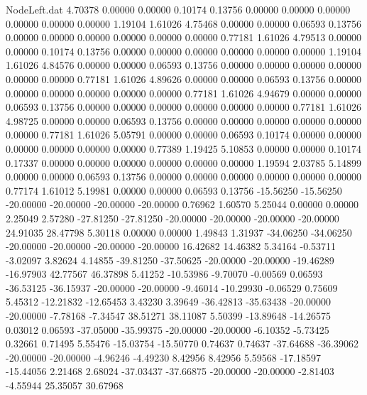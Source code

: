 \begin{filecontents}{NodeLeft.dat}
   4.70378    0.00000    0.00000     0.10174    0.13756    0.00000    0.00000    0.00000    0.00000    0.00000    0.00000    1.19104    1.61026
   4.75468    0.00000    0.00000     0.06593    0.13756    0.00000    0.00000    0.00000    0.00000    0.00000    0.00000    0.77181    1.61026
   4.79513    0.00000    0.00000     0.10174    0.13756    0.00000    0.00000    0.00000    0.00000    0.00000    0.00000    1.19104    1.61026
   4.84576    0.00000    0.00000     0.06593    0.13756    0.00000    0.00000    0.00000    0.00000    0.00000    0.00000    0.77181    1.61026
   4.89626    0.00000    0.00000     0.06593    0.13756    0.00000    0.00000    0.00000    0.00000    0.00000    0.00000    0.77181    1.61026
   4.94679    0.00000    0.00000     0.06593    0.13756    0.00000    0.00000    0.00000    0.00000    0.00000    0.00000    0.77181    1.61026
   4.98725    0.00000    0.00000     0.06593    0.13756    0.00000    0.00000    0.00000    0.00000    0.00000    0.00000    0.77181    1.61026
   5.05791    0.00000    0.00000     0.06593    0.10174    0.00000    0.00000    0.00000    0.00000    0.00000    0.00000    0.77389    1.19425
   5.10853    0.00000    0.00000     0.10174    0.17337    0.00000    0.00000    0.00000    0.00000    0.00000    0.00000    1.19594    2.03785
   5.14899    0.00000    0.00000     0.06593    0.13756    0.00000    0.00000    0.00000    0.00000    0.00000    0.00000    0.77174    1.61012
   5.19981    0.00000    0.00000     0.06593    0.13756  -15.56250  -15.56250  -20.00000  -20.00000  -20.00000  -20.00000    0.76962    1.60570
   5.25044    0.00000    0.00000     2.25049    2.57280  -27.81250  -27.81250  -20.00000  -20.00000  -20.00000  -20.00000   24.91035   28.47798
   5.30118    0.00000    0.00000     1.49843    1.31937  -34.06250  -34.06250  -20.00000  -20.00000  -20.00000  -20.00000   16.42682   14.46382
   5.34164   -0.53711   -3.02097     3.82624    4.14855  -39.81250  -37.50625  -20.00000  -20.00000  -19.46289  -16.97903   42.77567   46.37898
   5.41252  -10.53986   -9.70070    -0.00569    0.06593  -36.53125  -36.15937  -20.00000  -20.00000   -9.46014  -10.29930   -0.06529    0.75609
   5.45312  -12.21832  -12.65453     3.43230    3.39649  -36.42813  -35.63438  -20.00000  -20.00000   -7.78168   -7.34547   38.51271   38.11087
   5.50399  -13.89648  -14.26575     0.03012    0.06593  -37.05000  -35.99375  -20.00000  -20.00000   -6.10352   -5.73425    0.32661    0.71495
   5.55476  -15.03754  -15.50770     0.74637    0.74637  -37.64688  -36.39062  -20.00000  -20.00000   -4.96246   -4.49230    8.42956    8.42956
   5.59568  -17.18597  -15.44056     2.21468    2.68024  -37.03437  -37.66875  -20.00000  -20.00000   -2.81403   -4.55944   25.35057   30.67968

\end{filecontents}
